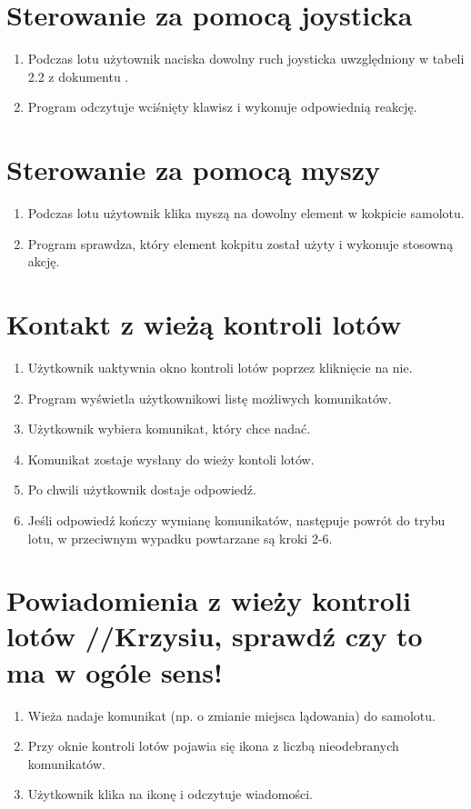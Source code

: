 \documentclass{mwrep}
\begin{document}
\section{Sterowanie za pomocą joysticka}
\begin{enumerate}
  \item Podczas lotu użytownik naciska dowolny ruch joysticka uwzględniony w tabeli 2.2 z dokumentu \cite{WYM}.
  \item Program odczytuje wciśnięty klawisz i wykonuje odpowiednią reakcję.
\end{enumerate}

\section{Sterowanie za pomocą myszy}
\begin{enumerate}
  \item Podczas lotu użytownik klika myszą na dowolny element w kokpicie samolotu.
  \item Program sprawdza, który element kokpitu został użyty i wykonuje stosowną akcję.
\end{enumerate}

\section{Kontakt z wieżą kontroli lotów}
\begin{enumerate}
  \item Użytkownik uaktywnia okno kontroli lotów poprzez kliknięcie na nie.
  \item Program wyświetla użytkownikowi listę możliwych komunikatów.
  \item Użytkownik wybiera komunikat, który chce nadać.
  \item Komunikat zostaje wysłany do wieży kontoli lotów.
  \item Po chwili użytkownik dostaje odpowiedź.
  \item Jeśli odpowiedź kończy wymianę komunikatów, następuje powrót do trybu lotu, w przeciwnym wypadku powtarzane są kroki 2-6.
\end{enumerate}

\section{Powiadomienia z wieży kontroli lotów //Krzysiu, sprawdź czy to ma w ogóle sens!}
\begin{enumerate}
  \item Wieża nadaje komunikat (np. o zmianie miejsca lądowania) do samolotu.
  \item Przy oknie kontroli lotów pojawia się ikona z liczbą nieodebranych komunikatów.
  \item Użytkownik klika na ikonę i odczytuje wiadomości.
\end{enumerate}
\end{document}
